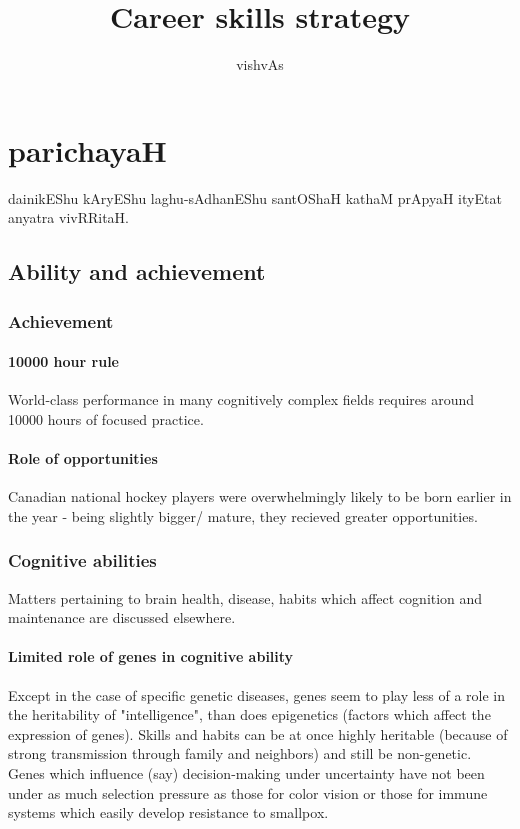 \documentclass[oneside, article]{memoir}
\title{Career skills strategy}
\author{vishvAs}
\begin{document}
\maketitle

\part{parichayaH}
dainikEShu kAryEShu laghu-sAdhanEShu santOShaH kathaM prApyaH ityEtat anyatra vivRRitaH.

\chapter{Ability and achievement}
\section{Achievement}
\subsection{10000 hour rule}
World-class performance in many cognitively complex fields requires around 10000 hours of focused practice.

\subsection{Role of opportunities}
Canadian national hockey players were overwhelmingly likely to be born earlier in the year - being slightly bigger/ mature, they recieved greater opportunities.

\section{Cognitive abilities}
Matters pertaining to brain health, disease, habits which affect cognition and maintenance are discussed elsewhere.

\subsection{Limited role of genes in cognitive ability}
Except in the case of specific genetic diseases, genes seem to play less of a role in the heritability of "intelligence", than does epigenetics (factors which affect the expression of genes). Skills and habits can be at once highly heritable (because of strong transmission through family and neighbors) and still be non-genetic. Genes which influence (say) decision-making under uncertainty have not been under as much selection pressure as those for color vision or those for immune systems which easily develop resistance to smallpox.
\end{document}
